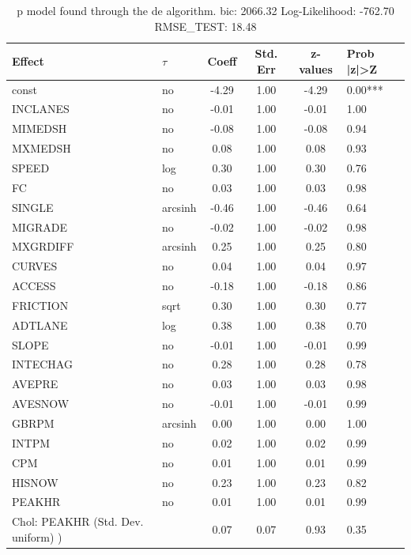\begin{table}
	\caption{p model found through the de algorithm. bic: 2066.32 Log-Likelihood: -762.70 RMSE_TEST: 18.48}
	\begin{center}
		\begin{tabular}{|l|l|c|c|c|l|}
			\hline
			Effect & $\tau$ & Coeff & Std. Err & z-values & Prob |z|>Z \\
			\hline
			const & no & -4.29 & 1.00 & -4.29 & 0.00*** \\
			\hline
			INCLANES & no & -0.01 & 1.00 & -0.01 & 1.00 \\
			\hline
			MIMEDSH & no & -0.08 & 1.00 & -0.08 & 0.94 \\
			\hline
			MXMEDSH & no & 0.08 & 1.00 & 0.08 & 0.93 \\
			\hline
			SPEED & log & 0.30 & 1.00 & 0.30 & 0.76 \\
			\hline
			FC & no & 0.03 & 1.00 & 0.03 & 0.98 \\
			\hline
			SINGLE & arcsinh & -0.46 & 1.00 & -0.46 & 0.64 \\
			\hline
			MIGRADE & no & -0.02 & 1.00 & -0.02 & 0.98 \\
			\hline
			MXGRDIFF & arcsinh & 0.25 & 1.00 & 0.25 & 0.80 \\
			\hline
			CURVES & no & 0.04 & 1.00 & 0.04 & 0.97 \\
			\hline
			ACCESS & no & -0.18 & 1.00 & -0.18 & 0.86 \\
			\hline
			FRICTION & sqrt & 0.30 & 1.00 & 0.30 & 0.77 \\
			\hline
			ADTLANE & log & 0.38 & 1.00 & 0.38 & 0.70 \\
			\hline
			SLOPE & no & -0.01 & 1.00 & -0.01 & 0.99 \\
			\hline
			INTECHAG & no & 0.28 & 1.00 & 0.28 & 0.78 \\
			\hline
			AVEPRE & no & 0.03 & 1.00 & 0.03 & 0.98 \\
			\hline
			AVESNOW & no & -0.01 & 1.00 & -0.01 & 0.99 \\
			\hline
			GBRPM & arcsinh & 0.00 & 1.00 & 0.00 & 1.00 \\
			\hline
			INTPM & no & 0.02 & 1.00 & 0.02 & 0.99 \\
			\hline
			CPM & no & 0.01 & 1.00 & 0.01 & 0.99 \\
			\hline
			HISNOW & no & 0.23 & 1.00 & 0.23 & 0.82 \\
			\hline
			PEAKHR & no & 0.01 & 1.00 & 0.01 & 0.99 \\
			\hline
			 Chol: PEAKHR (Std. Dev. uniform) ) &  & 0.07 & 0.07 & 0.93 & 0.35 \\
			\hline
		\end{tabular}
	\end{center}
\end{table}